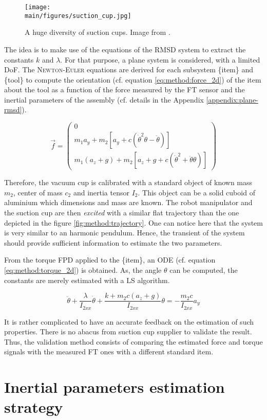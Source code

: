 \documentclass[/home/francois/latex/report/main.tex]{subfiles}
\begin{document}
\begin{figure}[H]
  \centering
  \texttt{[image: \\main/figures/suction\_cup.jpg]}
  \caption{A huge diversity of suction cups. Image from \cite{Piab2020}.}
  \label{fig:method:suction-cups}
\end{figure}

The idea is to make use of the equations of the \ac{RMSD} system to extract the constants $k$ and $\lambda$. For that purpose, a plane system is considered, with a limited \ac{DoF}. The \textsc{Newton-Euler} equations are derived for each subsystem \{item\} and \{tool\} to compute the orientation (cf. equation \ref{eq:method:force_2d}) of the item about the tool as a function of the force measured by the \ac{FT} sensor and the inertial parameters of the assembly (cf. details in the Appendix \ref{appendix:plane-rmsd}).

\begin{equation}
  \label{eq:method:force_2d}
  \overrightarrow{f}
  =
  \begin{pmatrix}
  0 \\
  m_1 a_y + m_2 [a_y + c (\dot{\theta}^2 \theta - \ddot{\theta})] \\
  m_1 (a_z + g) + m_2 [a_z + g + c (\dot{\theta}^2 + \ddot{\theta} \theta)]
  \end{pmatrix}
\end{equation}

Therefore, the vacuum cup is calibrated with a standard object of known mass $m_2$, center of mass $c_2$ and inertia tensor $I_2$. This object can be a solid cuboid of aluminium which dimensions and mass are known. The robot manipulator and the suction cup are then \textit{excited} with a similar flat trajectory than the one depicted in the figure \ref{fig:method:trajectory}. One can notice here that the system is very similar to an harmonic pendulum. Hence, the transient of the system should provide sufficient information to estimate the two parameters.

From the torque \ac{FPD} applied to the \{item\}, an \ac{ODE} (cf. equation \ref{eq:method:torque_2d}) is obtained. As, the angle $\theta$ can be computed, the constants are merely estimated with a \ac{LS} algorithm.

\begin{equation}
  \label{eq:method:torque_2d}
 \ddot{\theta} + \frac{\lambda}{I_{2xx}} \dot{\theta} + \frac{k + m_2 c (a_z + g)}{I_{2xx}} \theta = - \frac{m_2 c}{I_{2xx}} a_y
\end{equation}

It is rather complicated to have an accurate feedback on the estimation of such properties. There is no abacus from suction cup supplier to validate the result. Thus, the validation method consists of comparing the estimated force and torque signals with the measured \ac{FT} ones with a different standard item.

\section{Inertial parameters estimation strategy}
\end{document}
